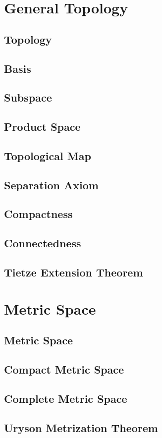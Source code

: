 \chapter{General Topology}


\section{Topology}
\section{Basis}
\section{Subspace}
\section{Product Space}
\section{Topological Map}
\section{Separation Axiom}
\section{Compactness}
\section{Connectedness}
\section{Tietze Extension Theorem}


\chapter{Metric Space}

\section{Metric Space}

\section{Compact Metric Space}

\section{Complete Metric Space}

\section{Uryson Metrization Theorem}

